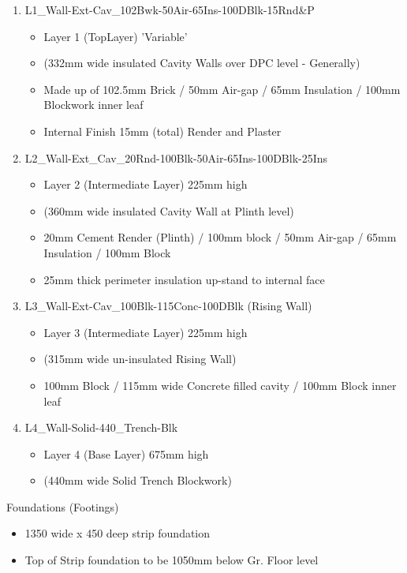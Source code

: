 \begin{enumerate}
	\item L1\_Wall-Ext-Cav\_102Bwk-50Air-65Ins-100DBlk-15Rnd\&P
	\begin{itemize}
		\item Layer 1 (TopLayer) 'Variable'
		\item (332mm wide insulated Cavity Walls over DPC level - Generally)
		\item Made up of 102.5mm Brick / 50mm Air-gap / 65mm Insulation / 100mm Blockwork inner leaf
		\item Internal Finish 15mm (total) Render and Plaster
	\end{itemize}
	
	\item L2\_Wall-Ext\_Cav\_20Rnd-100Blk-50Air-65Ins-100DBlk-25Ins
	\begin{itemize}
		\item Layer 2 (Intermediate Layer) 225mm high
		\item (360mm wide insulated Cavity Wall at Plinth level)
		\item 20mm Cement Render (Plinth) / 100mm block / 50mm Air-gap / 65mm Insulation / 100mm Block
		\item 25mm thick perimeter insulation up-stand to internal face
	\end{itemize}
	
	
	\item L3\_Wall-Ext-Cav\_100Blk-115Conc-100DBlk (Rising Wall)
	\begin{itemize}
		\item Layer 3 (Intermediate Layer) 225mm high
		\item (315mm wide un-insulated Rising Wall)
		\item 100mm Block / 115mm wide Concrete filled cavity / 100mm Block inner leaf
	\end{itemize}
	
	
	\item L4\_Wall-Solid-440\_Trench-Blk
	\begin{itemize}
		\item Layer 4 (Base Layer) 675mm high
		\item (440mm wide Solid Trench Blockwork)
	\end{itemize}
\end{enumerate}

Foundations (Footings)

\begin{itemize}
	\item 1350 wide x 450 deep strip foundation
	\item Top of Strip foundation to be 1050mm below Gr. Floor level
\end{itemize}



